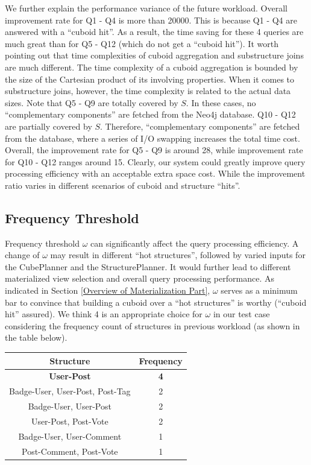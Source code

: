 We further explain the performance variance of the future workload. Overall improvement rate for Q1 - Q4 is more than 20000. This is because Q1 - Q4 are answered with a ``cuboid hit''. As a result, the time saving for these 4 queries are much great than for Q5 - Q12 (which do not get a ``cuboid hit''). It worth pointing out that time complexities of cuboid aggregation and substructure joins are much different. The time complexity of a cuboid aggregation is bounded by the size of the Cartesian product of its involving properties. When it comes to substructure joins, however, the time complexity is related to the actual data sizes. Note that Q5 - Q9 are totally covered by $S$. In these cases, no ``complementary components'' are fetched from the Neo4j database.  Q10 - Q12 are partially covered by $S$.  Therefore, ``complementary components'' are fetched from the database, where a series of I/O swapping increases the total time cost.  Overall, the improvement rate for Q5 - Q9 is around 28, while improvement rate for Q10 - Q12 ranges around 15. Clearly, our system could greatly improve query processing efficiency with an acceptable extra space cost. While the improvement ratio varies in different scenarios of cuboid and structure ``hits''.




\subsection{Frequency Threshold}
\label{Frequency Threshold}
Frequency threshold $\omega$ can significantly affect the query processing efficiency. A change of $\omega$ may result in different ``hot structures'', followed by varied inputs for the CubePlanner and the StructurePlanner. It would further lead to different materialized view selection and overall query processing performance. As indicated in Section \ref{Overview of Materialization Part}, $\omega$ serves as a minimum bar to convince that building a cuboid over a ``hot structures'' is worthy (``cuboid hit'' assured). We think 4 is an appropriate choice for $\omega$ in our test case considering the frequency count of structures in previous workload (as shown in the table below). 

\begin{center}
	\begin{tabular}{ | c | c |}  
		\hline
		Structure	&Frequency	\\ \hline 
		\textbf{User-Post} 	&\textbf{4} \\ \hline
		Badge-User, User-Post, Post-Tag 	&2 \\ \hline
		Badge-User, User-Post	&2 \\ \hline
		User-Post, Post-Vote	&2 \\ \hline
		Badge-User, User-Comment	&1 \\ \hline
		Post-Comment, Post-Vote	&1 \\ \hline
	\end{tabular}
	\end {center}
	
